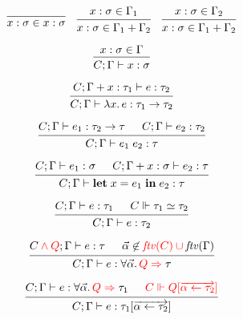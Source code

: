\documentclass[12pt]{article}
\begin{document}
\pagestyle{empty}

\[
    \begin{prooftree}
        \infer0{x:\sigma \in x:\sigma}
    \end{prooftree}
    \hspace{1em}
    \begin{prooftree}
        \hypo{x:\sigma \in \Gamma_1}
        \infer1{x:\sigma \in \Gamma_1 + \Gamma_2}
    \end{prooftree}
    \hspace{1em}
    \begin{prooftree}
        \hypo{x:\sigma \in \Gamma_2}
        \infer1{x:\sigma \in \Gamma_1 + \Gamma_2}
    \end{prooftree}
\]

\[
    \begin{prooftree}
        \hypo{x:\sigma \in \Gamma}
        \infer1{C; \Gamma \vdash x: \sigma}
    \end{prooftree}
\]

\[
    \begin{prooftree}
        \hypo{C; \Gamma + x: \tau_1 \vdash e: \tau_2}
        \infer1{C; \Gamma \vdash \lambda x\ldotp e: \tau_1 \to \tau_2}
    \end{prooftree}
\]

\[
    \begin{prooftree}
        \hypo{C; \Gamma \vdash e_1: \tau_2 \to \tau}
        \hypo{C; \Gamma \vdash e_2: \tau_2}
        \infer2{C; \Gamma \vdash e_1\; e_2: \tau}
    \end{prooftree}
\]

\[
    \begin{prooftree}
        \hypo{C; \Gamma \vdash e_1: \sigma}
        \hypo{C; \Gamma + x: \sigma \vdash e_2: \tau}
        \infer2{C; \Gamma \vdash \mathbf{let}\; x = e_1\;\mathbf{in}\; e_2: \tau}
    \end{prooftree}
\]

{\color{red}
\[
    \begin{prooftree}
        \hypo{C; \Gamma \vdash e: \tau_1}
        \hypo{C \Vdash \tau_1 \simeq \tau_2}
        \infer2{C; \Gamma \vdash e: \tau_2}
    \end{prooftree}
\]
}

\[
    \begin{prooftree}
        \hypo{C {\color{red} {}\land Q}; \Gamma \vdash e: \tau}
        \hypo{\vec{\alpha} \not\in {\color{red} \mathit{ftv}(C) \cup {}} \mathit{ftv}(\Gamma)}
        \infer2{C; \Gamma \vdash e: \forall \vec{\alpha}\ldotp {\color{red} Q \Rightarrow {}} \tau}
    \end{prooftree}
\]

\[
    \begin{prooftree}
        \hypo{C; \Gamma \vdash e: \forall \vec{\alpha}\ldotp {\color{red} Q \Rightarrow {}} \tau_1}
        \hypo{\color{red} C \Vdash Q[\overrightarrow{\alpha \leftarrow \tau_2}]}
        \infer2{C; \Gamma \vdash e: \tau_1[\overrightarrow{\alpha \leftarrow \tau_2}]}
    \end{prooftree}
\]
\end{document}
